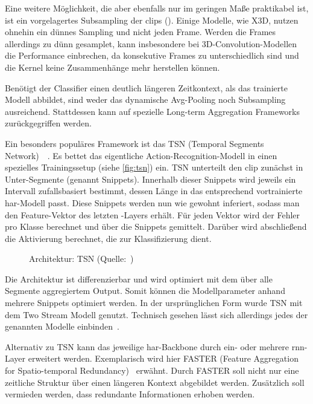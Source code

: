 Eine weitere Möglichkeit, die aber ebenfalls nur im geringen Maße praktikabel ist, ist ein vorgelagertes Subsampling der \glspl{clip} (\cite{Ng15}).
Einige Modelle, wie X3D, nutzen ohnehin ein dünnes Sampling und nicht jeden Frame.
Werden die Frames allerdings zu dünn gesamplet, kann insbesondere bei 3D-Convolution-Modellen die Performance einbrechen, da konsekutive Frames zu unterschiedlich sind und die Kernel keine Zusammenhänge mehr herstellen können.

Benötigt der Classifier einen deutlich längeren Zeitkontext, als das trainierte Modell abbildet, sind weder das dynamische Avg-Pooling noch Subsampling ausreichend.
Stattdessen kann auf spezielle Long-term Aggregation Frameworks zurückgegriffen werden.

Ein besonders populäres Framework ist das TSN (Temporal Segments Network)~\cite{Wang16}~\cite{Wang19}.
Es bettet das eigentliche Action-Recognition-Modell in einen spezielles Trainingssetup (siehe \autoref{fig:tsn}) ein.
TSN unterteilt den \gls{clip} zunächst in Unter-Segmente (genannt Snippets).
Innerhalb dieser Snippets wird jeweils ein Intervall zufallsbasiert bestimmt, dessen Länge in das entsprechend vortrainierte \gls{har}-Modell passt.
Diese Snippets werden nun wie gewohnt inferiert, sodass man den Feature-Vektor des letzten \fc-Layers erhält.
Für jeden Vektor wird der Fehler pro Klasse berechnet und über die Snippets gemittelt.
Darüber wird abschließend die Aktivierung berechnet, die zur Klassifizierung dient.

\begin{figure}[h!]
    \centering
    \caption{Architektur: TSN (Quelle:~\cite{Wang19})}
    \label{fig:tsn}
\end{figure}

Die Architektur ist differenzierbar und wird optimiert mit dem über alle Segmente aggregiertem Output.
Somit können die Modellparameter anhand mehrere Snippets optimiert werden.
In der ursprünglichen Form wurde TSN mit dem Two Stream Modell genutzt.
Technisch gesehen lässt sich allerdings jedes der genannten Modelle einbinden~\cite{Kothawade19}.

Alternativ zu TSN kann das jeweilige \gls{har}-Backbone durch ein- oder mehrere \gls{rnn}-Layer erweitert werden.
Exemplarisch wird hier FASTER (Feature Aggregation for Spatio-temporal Redundancy)~\cite{Zhu19} erwähnt.
Durch FASTER soll nicht nur eine zeitliche Struktur über einen längeren Kontext abgebildet werden.
Zusätzlich soll vermieden werden, dass redundante Informationen erhoben werden.

